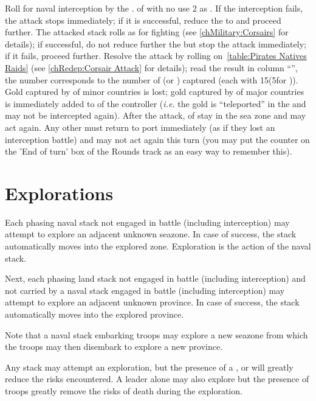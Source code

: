 \bparag Roll for naval interception by the \corsaire. \corsaire of
 with no \LeaderA use 2 as \Man.
\bparag If the interception fails, the attack stops immediately; if it is
successful, reduce the \corsaire to \Facemoins and proceed further.
\bparag The attacked stack rolls as for fighting \corsaire (see
\ref{chMilitary:Corsairs} for details); if successful, do not reduce further
the \corsaire but stop the attack immediately; if it fails, proceed further.
\bparag Resolve the attack by rolling on~\ref{table:Pirates Natives Raids}
(see \ref{chRedep:Corsair Attack} for details); read the result in column
``\TradeFLEET\faceplus'', the number corresponds to the number of \NTD (or
\NWD) captured (each with 15\ducats (5\ducats for \NWD)).
\bparag Gold captured by \corsaire of minor countries is lost; gold captured by
\corsaire of major countries is immediately added to
 of the controller (\emph{i.e.} the gold
is ``teleported'' in the \RT and may not be intercepted again).
\bparag After the attack, \corsaire of  stay in the sea zone and
may act again. Any other \corsaire must return to port immediately (as if they
lost an interception battle) and may not act again this turn (you may put the
counter on the 'End of turn' box of the Rounds track as an easy way to
remember this).

\section{Explorations}\label{chMilitary:Discoveries}
\label{chMilitary:Exploration}
Each phasing naval stack not engaged in battle (including interception) may
attempt to explore an adjacent unknown seazone. In case of success, the stack
automatically moves into the explored zone. Exploration is the action of the
naval stack.

Next, each phasing land stack not engaged in battle (including interception)
and not carried by a naval stack engaged in battle (including interception)
may attempt to explore an adjacent unknown province. In case of success, the
stack automatically moves into the explored province.

Note that a naval stack embarking troops may explore a new seazone from which
the troops may then disembark to explore a new province.

Any stack may attempt an exploration, but the presence of a \LeaderE, \LeaderC
or \LeaderGov will greatly reduce the risks encountered. A leader alone may
also explore but the presence of troops greatly remove the risks of death
during the exploration.

